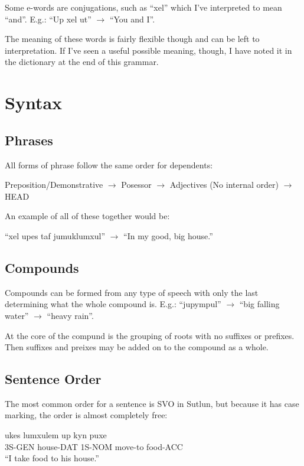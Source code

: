 \documentclass{book}
\begin{document}
Some e-words are conjugations, such as ``xel'' which I've interpreted to mean ``and''.
E.g.: ``Up xel ut'' $\rightarrow$ ``You and I''.

The meaning of these words is fairly flexible though and can be left to interpretation. If I've seen
a useful possible meaning, though, I have noted it in the dictionary at the end of this grammar.



\chapter{Syntax}
\section{Phrases}
All forms of phrase follow the same order for dependents:

\begin{center}
    Preposition/Demonstrative $\rightarrow$ Posessor $\rightarrow$ Adjectives (No internal order) $\rightarrow$ HEAD
\end{center}

An example of all of these together would be:

\begin{center}
    ``xel upes taf jumuklumxul'' $\rightarrow$ ``In my good, big house.''
\end{center}

\section{Compounds}
Compounds can be formed from any type of speech with only the last determining what
the whole compound is. E.g.: ``jupympul'' $\rightarrow$ ``big falling water'' $\rightarrow$ ``heavy rain''.

At the core of the compund is the grouping of roots with no suffixes or prefixes. Then suffixes and
preixes may be added on to the compound as a whole.


\section{Sentence Order}
The most common order for a sentence is SVO in Sutlun, but because it has case marking, the
order is almost completely free:

\begin{exe}
    \ex
    \gll ukes lumxulem up kyn puxe \\
    3S-GEN house-DAT 1S-NOM move-to food-ACC \\
    \glt ``I take food to his house.''
\end{exe}
\end{document}

